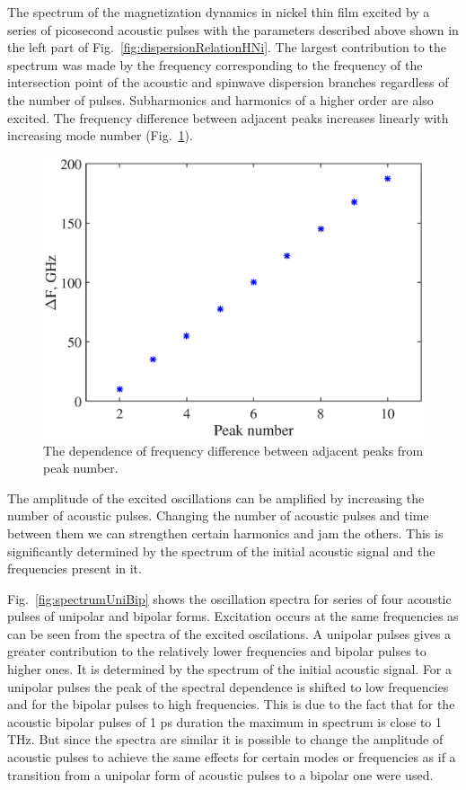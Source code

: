 \documentclass[%
superscriptaddress,
preprint,
showpacs,
amsmath,
amssymb,
aps,
prl,
]{revtex4-1}
\begin{document}
The spectrum of the magnetization dynamics in nickel thin film excited by a series of picosecond acoustic pulses with the parameters described above shown in the left part of Fig.~\ref{fig:dispersionRelationHNi}. The largest contribution to the spectrum was made by the frequency corresponding to the frequency of the intersection point of the acoustic and spinwave dispersion branches regardless of the number of pulses. Subharmonics and harmonics of a higher order are also excited. The frequency difference between adjacent peaks increases linearly with increasing mode number (Fig.~\ref{fig:dF_regularity}).
	
\begin{figure}[ht]
	\centering
	\includegraphics[width=0.95\columnwidth]{dF_regularity.eps}
	\caption{The dependence of frequency difference between adjacent peaks from peak number.}
	\label{fig:dF_regularity}
\end{figure}
	
The amplitude of the excited oscillations can be amplified by increasing the number of acoustic pulses. Changing the number of acoustic pulses and time between them we can strengthen certain harmonics and jam the others. This is significantly determined by the spectrum of the initial acoustic signal and the frequencies present in it.
	
Fig.~\ref{fig:spectrumUniBip} shows the oscillation spectra for series of four acoustic pulses of unipolar and bipolar forms. Excitation occurs at the same frequencies as can be seen from the spectra of the excited oscilations. A unipolar pulses gives a greater contribution to the relatively lower frequencies and bipolar pulses to higher ones. It is determined by the spectrum of the initial acoustic signal. For a unipolar pulses the peak of the spectral dependence is shifted to low frequencies and for the bipolar pulses to high frequencies. This is due to the fact that for the acoustic bipolar pulses of 1 ps duration the maximum in spectrum is close to 1 THz. But since the spectra are similar it is possible to change the amplitude of acoustic pulses to achieve the same effects for certain modes or frequencies as if a transition from a unipolar form of acoustic pulses to a bipolar one were used.
	
\end{document}
